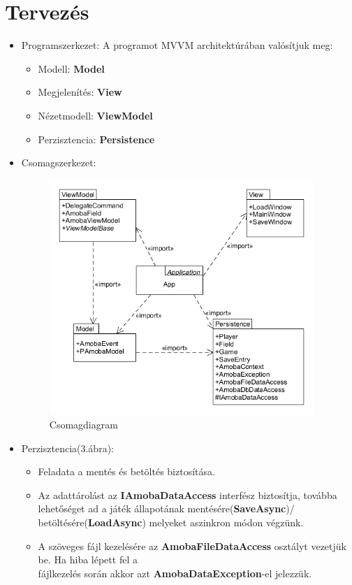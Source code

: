 \documentclass[11pt,a4paper]{article}
\begin{document}
\section{Tervezés}
\begin{itemize}
	\item Programszerkezet: A programot MVVM architektúrában valósítjuk meg:
	\begin{itemize}
		\item Modell: \textbf{Model}
		\item Megjelenítés: \textbf{View}
		\item Nézetmodell: \textbf{ViewModel}
		\item Perzisztencia: \textbf{Persistence}
	\end{itemize}
	\item Csomagszerkezet:
	\begin{figure}[h]
		\centering
		\includegraphics[width=10cm]{UMLs/Package.png}
		\caption{Csomagdiagram}
	\end{figure}
	\item Perzisztencia(3.ábra):
	\begin{itemize}
		\item Feladata a mentés és betöltés biztosítása.
		\item Az adattárolást az \textbf{IAmobaDataAccess} interfész biztosítja, továbba
		lehetőséget ad a játék állapotának mentésére(\textbf{SaveAsync})/
		betöltésére(\textbf{LoadAsync})	melyeket aszinkron módon végzünk.
		\item A szöveges fájl kezelésére az \textbf{AmobaFileDataAccess} osztályt vezetjük be.
		Ha hiba lépett fel a\\fájlkezelés során akkor azt \textbf{AmobaDataException}-el jelezzük.

\end{itemize}
\end{itemize}
\end{document}
